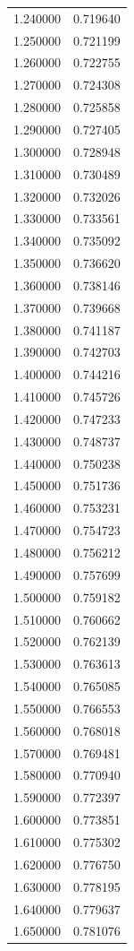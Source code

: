 \begin{tabular}{rr}
1.240000 & 0.719640 \\
1.250000 & 0.721199 \\
1.260000 & 0.722755 \\
1.270000 & 0.724308 \\
1.280000 & 0.725858 \\
1.290000 & 0.727405 \\
1.300000 & 0.728948 \\
1.310000 & 0.730489 \\
1.320000 & 0.732026 \\
1.330000 & 0.733561 \\
1.340000 & 0.735092 \\
1.350000 & 0.736620 \\
1.360000 & 0.738146 \\
1.370000 & 0.739668 \\
1.380000 & 0.741187 \\
1.390000 & 0.742703 \\
1.400000 & 0.744216 \\
1.410000 & 0.745726 \\
1.420000 & 0.747233 \\
1.430000 & 0.748737 \\
1.440000 & 0.750238 \\
1.450000 & 0.751736 \\
1.460000 & 0.753231 \\
1.470000 & 0.754723 \\
1.480000 & 0.756212 \\
1.490000 & 0.757699 \\
1.500000 & 0.759182 \\
1.510000 & 0.760662 \\
1.520000 & 0.762139 \\
1.530000 & 0.763613 \\
1.540000 & 0.765085 \\
1.550000 & 0.766553 \\
1.560000 & 0.768018 \\
1.570000 & 0.769481 \\
1.580000 & 0.770940 \\
1.590000 & 0.772397 \\
1.600000 & 0.773851 \\
1.610000 & 0.775302 \\
1.620000 & 0.776750 \\
1.630000 & 0.778195 \\
1.640000 & 0.779637 \\
1.650000 & 0.781076 \\

\end{tabular}
